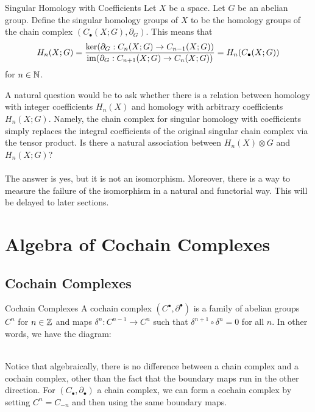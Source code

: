 \documentclass[a4paper]{article}
\begin{document}
\begin{defn}{Singular Homology with Coefficients}{} Let $X$ be a space. Let $G$ be an abelian group. Define the singular homology groups of $X$ to be the homology groups of the chain complex $(C_\bullet(X;G),\partial_G)$. This means that $$H_n(X;G)=\frac{\ker(\partial_G:C_n(X;G)\to C_{n-1}(X;G))}{\operatorname{im}(\partial_G:C_{n+1}(X;G)\to C_n(X;G))}=H_n(C_\bullet(X;G))$$ for $n\in\mathbb{N}$. 
\end{defn}

A natural question would be to ask whether there is a relation between homology with integer coefficients $H_n(X)$ and homology with arbitrary coefficients $H_n(X;G)$. Namely, the chain complex for singular homology with coefficients simply replaces the integral coefficients of the original singular chain complex via the tensor product. Is there a natural association between $H_n(X)\otimes G$ and $H_n(X;G)$? \\~\\

The answer is yes, but it is not an isomorphism. Moreover, there is a way to measure the failure of the isomorphism in a natural and functorial way. This will be delayed to later sections. 

\pagebreak
\section{Algebra of Cochain Complexes}
\subsection{Cochain Complexes}
\begin{defn}{Cochain Complexes}{} A cochain complex $(C^\bullet,\partial^\bullet)$ is a family of abelian groups $C^n$ for $n\in\mathbb{Z}$ and maps $\delta^n:C^{n-1}\to C^n$ such that $\delta^{n+1}\circ\delta^n=0$ for all $n$. In other words, we have the diagram: \\~\\
\end{defn}

Notice that algebraically, there is no difference between a chain complex and a cochain complex, other than the fact that the boundary maps run in the other direction. For $(C_\bullet,\partial_\bullet)$ a chain complex, we can form a cochain complex by setting $C^n=C_{-n}$ and then using the same boundary maps. 
\end{document}
